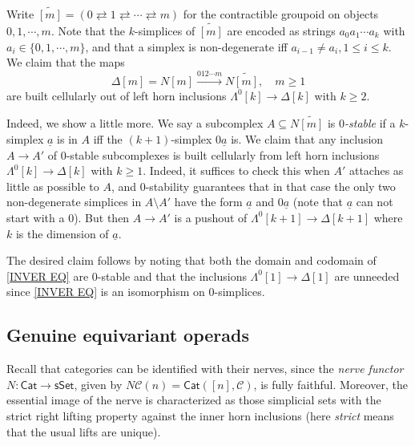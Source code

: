 \documentclass[a4paper,10pt
 ,draft
]{article}%
\begin{document}
\begin{remark}\label{CONTGR REM}
Write 
$\widetilde{[m]} = 
(0 \rightleftarrows 1 
\rightleftarrows \cdots 
\rightleftarrows m)$
for the contractible groupoid on objects $0,1,\cdots,m$. Note that the $k$-simplices of $\widetilde{[m]}$
are encoded as strings $a_0 a_1 \cdots a_k$
with $a_{i} \in \{0,1,\cdots,m\}$, and that a simplex is non-degenerate iff $a_{i-1}\not = a_{i}, 1 \leq i \leq k$.
We claim that the maps
\begin{equation}\label{INVER EQ}
	\Delta[m] = N [m] \xrightarrow{012\cdots m} N \widetilde{[m]},\quad m \geq 1
\end{equation}
are built cellularly out of left horn inclusions $\Lambda^{0}[k] \to \Delta[k]$ with $k\geq 2$.

Indeed, we show a little more. We say a subcomplex 
$A \subseteq N \widetilde{[m]}$ is \textit{$0$-stable}
if a $k$-simplex $\underline{a}$ is in $A$ iff the $(k+1)$-simplex $0\underline{a}$ is.
We claim that any inclusion $A \to A'$ of $0$-stable subcomplexes is built cellularly from left horn inclusions $\Lambda^{0}[k] \to \Delta[k]$ with $k\geq 1$.
Indeed, it suffices to check this when $A'$ attaches as little as 
possible to $A$, and $0$-stability guarantees that in that case the only two non-degenerate simplices in $A \setminus A'$
have the form 
$\underline{a}$ and $0\underline{a}$
(note that $\underline{a}$ can not start with a $0$).
But then $A\to A'$ is a pushout of 
$\Lambda^{0}[k+1] \to \Delta[k+1]$ where $k$ is the dimension of $\underline{a}$.

The desired claim follows by noting that both the domain and codomain of \eqref{INVER EQ} are $0$-stable and that the  inclusions 
$\Lambda^0[1] \to \Delta[1]$ are unneeded since \eqref{INVER EQ} is an isomorphism on $0$-simplices.
\end{remark}



\subsection{Genuine equivariant operads}\label{GENEQOP SEC}


Recall that categories can be identified with their nerves, since the \textit{nerve functor}
$N \colon \mathsf{Cat} \to \mathsf{sSet}$, 
given by $N\mathcal C (n) = \mathsf{Cat}([n], \mathcal C)$, 
is fully faithful.
Moreover, the essential image of the nerve is characterized as those simplicial sets
with the strict right lifting property 
against the inner horn inclusions \cite[Prop. 1.1.2.2]{Lur09}
(here \textit{strict} means that the usual lifts are unique).
\end{document}
